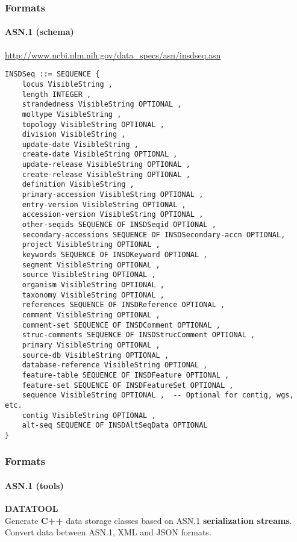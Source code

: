 \documentclass{beamer}
\begin{document}
\begin{frame}[fragile]
\frametitle{Formats}
\framesubtitle{ASN.1 (schema)}
\url{http://www.ncbi.nlm.nih.gov/data_specs/asn/insdseq.asn}
\begin{lstlisting}[basicstyle=\tiny,breaklines=false]
INSDSeq ::= SEQUENCE {
    locus VisibleString ,
    length INTEGER ,
    strandedness VisibleString OPTIONAL ,
    moltype VisibleString ,
    topology VisibleString OPTIONAL ,
    division VisibleString ,
    update-date VisibleString ,
    create-date VisibleString OPTIONAL ,
    update-release VisibleString OPTIONAL ,
    create-release VisibleString OPTIONAL ,
    definition VisibleString ,
    primary-accession VisibleString OPTIONAL ,
    entry-version VisibleString OPTIONAL ,
    accession-version VisibleString OPTIONAL ,
    other-seqids SEQUENCE OF INSDSeqid OPTIONAL ,
    secondary-accessions SEQUENCE OF INSDSecondary-accn OPTIONAL,
    project VisibleString OPTIONAL ,
    keywords SEQUENCE OF INSDKeyword OPTIONAL ,
    segment VisibleString OPTIONAL ,
    source VisibleString OPTIONAL ,
    organism VisibleString OPTIONAL ,
    taxonomy VisibleString OPTIONAL ,
    references SEQUENCE OF INSDReference OPTIONAL ,
    comment VisibleString OPTIONAL ,
    comment-set SEQUENCE OF INSDComment OPTIONAL ,
    struc-comments SEQUENCE OF INSDStrucComment OPTIONAL ,
    primary VisibleString OPTIONAL ,
    source-db VisibleString OPTIONAL ,
    database-reference VisibleString OPTIONAL ,
    feature-table SEQUENCE OF INSDFeature OPTIONAL ,
    feature-set SEQUENCE OF INSDFeatureSet OPTIONAL ,
    sequence VisibleString OPTIONAL ,  -- Optional for contig, wgs, etc.
    contig VisibleString OPTIONAL ,
    alt-seq SEQUENCE OF INSDAltSeqData OPTIONAL
}
\end{lstlisting}
\end{frame}

\begin{frame}[fragile]
\frametitle{Formats}
\framesubtitle{ASN.1 (tools)}
\begin{center}
{\bf DATATOOL}\\
Generate {\bf C++ }data storage classes based on ASN.1
{\bf serialization streams}.\\
Convert data between ASN.1, XML and JSON formats.\\
\end{center}
\end{frame}
\end{document}
